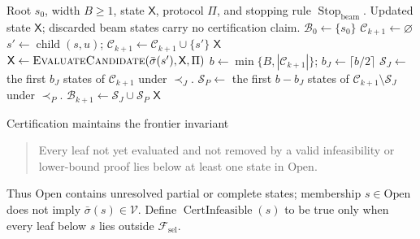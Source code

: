 \documentclass[a4paper,onecolumn,11pt,unpublished]{quantumarticle}
\theoremstyle{remark}
\begin{document}
\begin{algorithm}[H]
\caption{Deterministic width-$B$ Pareto-beam search}
\label{alg:app-pareto-beam}
\begin{algorithmic}[1]
\Require Root $s_0$, width $B\ge1$, state $\mathsf X$, protocol $\Pi$, and stopping
rule $\operatorname{Stop}_{\mathrm{beam}}$.
\Ensure Updated state $\mathsf X$; discarded beam states carry no certification claim.
\State $\mathcal B_0\gets\{s_0\}$
    \State $\mathcal C_{k+1}\gets\varnothing$
            \State $s'\gets\operatorname{child}(s,u)$;
            $\mathcal C_{k+1}\gets\mathcal C_{k+1}\cup\{s'\}$
                \State \Return $\mathsf X$
            \EndIf
            \State $\mathsf X\gets
            \Call{EvaluateCandidate}{\bar\sigma(s'),\mathsf X,\Pi}$
        \EndFor
    \EndFor
    \State $b\gets\min\{B,|\mathcal C_{k+1}|\}$;
    $b_J\gets\lceil b/2\rceil$
    \State $\mathcal S_J\gets$ the first $b_J$ states of $\mathcal C_{k+1}$ under
    $\prec_J$.
    \State $\mathcal S_P\gets$ the first $b-b_J$ states of
    $\mathcal C_{k+1}\setminus\mathcal S_J$ under $\prec_P$.
    \State $\mathcal B_{k+1}\gets\mathcal S_J\cup\mathcal S_P$
\EndFor
\State \Return $\mathsf X$
\end{algorithmic}
\end{algorithm}

Certification maintains the frontier invariant
\begin{quote}
Every leaf not yet evaluated and not removed by a valid infeasibility or lower-bound
proof lies below at least one state in $\mathrm{Open}$.
\end{quote}
Thus $\mathrm{Open}$ contains unresolved partial or complete states; membership
$s\in\mathrm{Open}$ does not imply $\bar\sigma(s)\in\mathcal V$.  Define
$\operatorname{CertInfeasible}(s)$ to be true only when every leaf below $s$ lies outside
$\mathcal F_{\mathrm{sel}}$.
\end{document}
